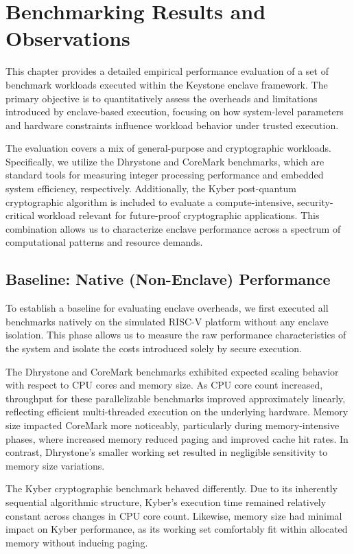\chapter{Benchmarking Results and Observations}
\label{chap:benchmarking}

This chapter provides a detailed empirical performance evaluation of a set of benchmark workloads executed within the Keystone enclave framework. The primary objective is to quantitatively assess the overheads and limitations introduced by enclave-based execution, focusing on how system-level parameters and hardware constraints influence workload behavior under trusted execution.

The evaluation covers a mix of general-purpose and cryptographic workloads. Specifically, we utilize the Dhrystone and CoreMark benchmarks, which are standard tools for measuring integer processing performance and embedded system efficiency, respectively. Additionally, the Kyber post-quantum cryptographic algorithm is included to evaluate a compute-intensive, security-critical workload relevant for future-proof cryptographic applications. This combination allows us to characterize enclave performance across a spectrum of computational patterns and resource demands.

\section{Baseline: Native (Non-Enclave) Performance}

To establish a baseline for evaluating enclave overheads, we first executed all benchmarks natively on the simulated RISC-V platform without any enclave isolation. This phase allows us to measure the raw performance characteristics of the system and isolate the costs introduced solely by secure execution.

The Dhrystone and CoreMark benchmarks exhibited expected scaling behavior with respect to CPU cores and memory size. As CPU core count increased, throughput for these parallelizable benchmarks improved approximately linearly, reflecting efficient multi-threaded execution on the underlying hardware. Memory size impacted CoreMark more noticeably, particularly during memory-intensive phases, where increased memory reduced paging and improved cache hit rates. In contrast, Dhrystone’s smaller working set resulted in negligible sensitivity to memory size variations.

The Kyber cryptographic benchmark behaved differently. Due to its inherently sequential algorithmic structure, Kyber’s execution time remained relatively constant across changes in CPU core count. Likewise, memory size had minimal impact on Kyber performance, as its working set comfortably fit within allocated memory without inducing paging.

